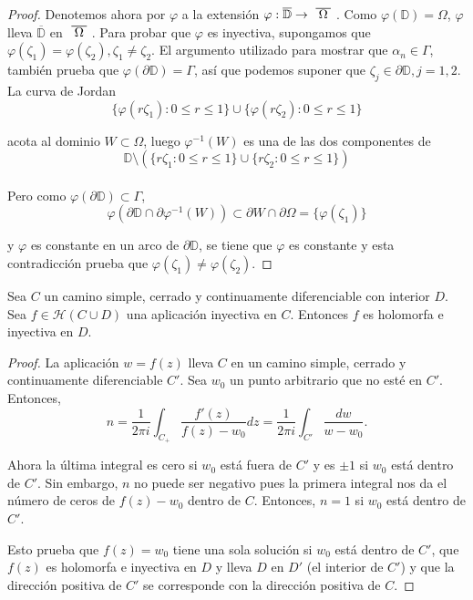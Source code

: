 \begin{proof}
    Denotemos ahora por $\varphi$ a la extensión $\varphi : \overline{\mathbb{D}} \rightarrow \xbar{\Omega}$. Como $\varphi(\mathbb{D}) = \Omega$, $\varphi$ lleva  $\overline{\mathbb{D}}$ en $\xbar{\Omega}$. Para probar que $\varphi$ es inyectiva, supongamos que $\varphi(\zeta_1) = \varphi(\zeta_2), \zeta_1 \not = \zeta_2$. El argumento utilizado para mostrar que $\alpha_n \in \Gamma$, también prueba que $\varphi (\partial \mathbb{D}) = \Gamma$, así que podemos suponer que $\zeta_j \in \partial \mathbb{D}, j=1,2$. La curva de Jordan
    \begin{equation*}
        \{\varphi (r \zeta_1) : 0 \leq r \leq 1\} \cup \{\varphi (r \zeta_2) : 0 \leq r \leq 1\}
    \end{equation*}

    acota al dominio $W \subset \Omega$, luego $\varphi ^{-1} (W)$ es una de las dos componentes de
    \begin{equation*}
        \mathbb{D} \setminus ( \{ r \zeta_1 : 0 \leq r \leq 1\} \cup \{ r \zeta_2 : 0 \leq r \leq 1\})
    \end{equation*}
    \\
    Pero como $\varphi(\partial \mathbb{D}) \subset \Gamma$,
    \begin{equation*}
        \varphi(\partial \mathbb{D} \cap \partial \varphi ^{-1} (W)) \subset \partial W \cap \partial \Omega = \{ \varphi (\zeta_1)\}
    \end{equation*}

    y $\varphi$ es constante en un arco de $\partial \mathbb{D}$, se tiene que $\varphi$ es constante y esta contradicción prueba que $\varphi(\zeta_1) \not = \varphi(\zeta_2)$.
\end{proof}

\begin{theorem}
    Sea $C$ un camino simple, cerrado y continuamente diferenciable con interior $D$. Sea $f \in \mathcal{H}(C \cup D)$ una aplicación inyectiva en $C$. Entonces $f$ es holomorfa e inyectiva en $D$.
\end{theorem}

\begin{proof}
    La aplicación $w = f(z)$ lleva $C$ en un camino simple, cerrado y continuamente diferenciable $C'$. Sea $w_0$ un punto arbitrario que no esté en $C'$. Entonces,
    \begin{equation*}
        n = \dfrac{1}{2 \pi i} \int_{C_+} \dfrac{f'(z)}{f(z) - w_0} dz =  \dfrac{1}{2 \pi i} \int_{C'} \dfrac{dw}{w - w_0}.
    \end{equation*}

    Ahora la última integral es cero si $w_0$ está fuera de $C'$ y es $\pm 1$ si $w_0$ está dentro de $C'$. Sin embargo, $n$ no puede ser negativo pues la primera integral nos da el número de ceros de $f(z) - w_0$ dentro de $C$. Entonces, $n=1$ si $w_0$ está dentro de $C'$.

    Esto prueba que $f(z) = w_0$ tiene una sola solución si $w_0$ está dentro de $C'$, que $f(z)$ es holomorfa e inyectiva en $D$ y lleva $D$ en $D'$ (el interior de $C'$) y que la dirección positiva de $C'$ se corresponde con la dirección positiva de $C$.
\end{proof}

